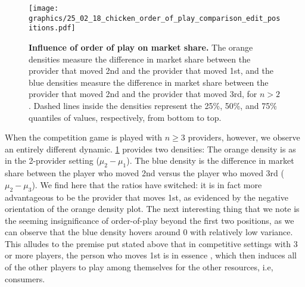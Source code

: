 \begin{figure}[t!]
\centering
\texttt{[image: graphics/25\_02\_18\_chicken\_order\_of\_play\_comparison\_edit\_positions.pdf]}
\caption{%
\textbf{Influence of order of play on market share. }
The orange densities measure the difference in market share between the provider that moved 2nd and the provider that moved 1st, and the blue densities measure the difference in market share between the provider that moved 2nd and the provider that moved 3rd, for $n>2$. Dashed lines inside the densities represent the 25\%, 50\%, and 75\% quantiles of values, respectively, from bottom to top.
}
\label{fig:order_of_play}
\end{figure}

 When the competition game is played with $n\ge3$ providers, however,  we observe an entirely different dynamic.
\cref{fig:order_of_play} provides two densities: The orange density is as in the 2-provider setting ($\mu_2 - \mu_1$). The blue density is the difference in market share between the player who moved 2nd versus the player who moved 3rd ($\mu_2 - \mu_3$).
We find here that the ratios have switched: it is in fact more advantageous to be the provider that moves 1st, as evidenced by the negative orientation of the orange density plot. The next interesting thing that we note is the seeming insignificance of order-of-play beyond the first two positions, as we can observe that the blue density hovers around 0 with relatively low variance. This alludes to the premise put stated above that in competitive settings with 3 or more players, the person who moves 1st is in essence , which then induces all of the other players to play among themselves for the other resources, i.e, consumers.


